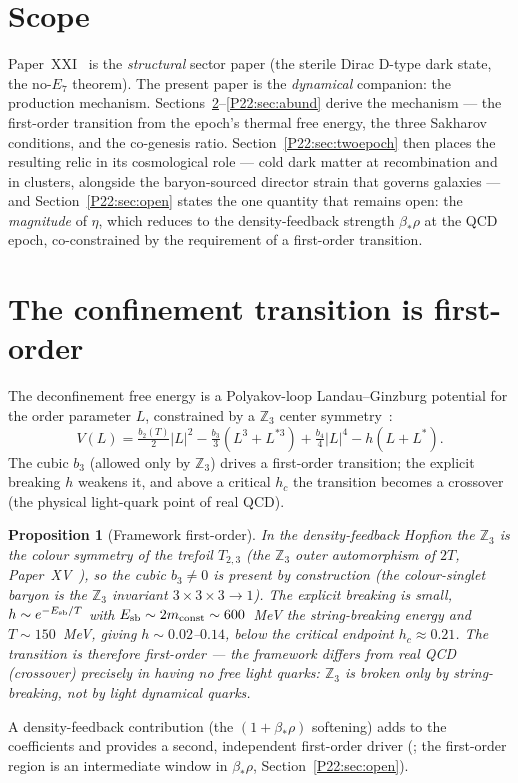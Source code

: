\documentclass[11pt,a4paper]{article}
\newtheorem{proposition}[theorem]{Proposition}
\theoremstyle{definition}\newtheorem{definition}[theorem]{Definition}
\newcommand{\twoT}{2T}
\newcommand{\Zthree}{\mathbb{Z}_3}
\begin{document}
\tableofcontents

\section{Scope}
Paper~XXI~\cite{Paper21} is the \emph{structural} sector paper (the sterile Dirac D-type
dark state, the no-$E_7$ theorem). The present paper is the \emph{dynamical} companion: the
production mechanism. Sections~\ref{P22:sec:fo}--\ref{P22:sec:abund} derive the mechanism --- the
first-order transition from the epoch's thermal free energy, the three Sakharov conditions, and
the co-genesis ratio. Section~\ref{P22:sec:twoepoch} then places the resulting relic in its
cosmological role --- cold dark matter at recombination and in clusters, alongside the
baryon-sourced director strain that governs galaxies --- and Section~\ref{P22:sec:open} states
the one quantity that remains open: the \emph{magnitude} of $\eta$, which reduces to the
density-feedback strength $\beta_*\rho$ at the QCD epoch, co-constrained by the requirement of a
first-order transition.

\section{The confinement transition is first-order}
\label{P22:sec:fo}
The deconfinement free energy is a Polyakov-loop Landau--Ginzburg potential for the order
parameter $L$, constrained by a $\Zthree$ center symmetry~\cite{Pisarski2000}:
\begin{equation}
  V(L)=\tfrac{b_2(T)}{2}|L|^2-\tfrac{b_3}{3}(L^3+L^{*3})+\tfrac{b_4}{4}|L|^4-h(L+L^*).
  \label{P22:eq:polyakov}
\end{equation}
The cubic $b_3$ (allowed only by $\Zthree$) drives a first-order transition; the explicit
breaking $h$ weakens it, and above a critical $h_c$ the transition becomes a crossover
(the physical light-quark point of real QCD).

\begin{proposition}[Framework first-order]
\label{P22:prop:fo}
In the density-feedback Hopfion the $\Zthree$ is the colour symmetry of the trefoil
$T_{2,3}$ (the $\Zthree$ outer automorphism of $\twoT$, Paper~XV~\cite{Paper15}), so the
cubic $b_3\neq0$ is present by construction (the colour-singlet baryon is the $\Zthree$
invariant $3\times3\times3\to1$). The explicit breaking is small, $h\sim e^{-E_{\rm sb}/T}$
with $E_{\rm sb}\sim2m_{\rm const}\sim600$~MeV the string-breaking energy and
$T\sim150$~MeV, giving $h\sim0.02$--$0.14$, below the critical endpoint $h_c\approx0.21$.
The transition is therefore first-order --- the framework differs from real QCD (crossover)
precisely in having no free light quarks: $\Zthree$ is broken only by string-breaking, not by
light dynamical quarks.
\end{proposition}
\noindent A density-feedback contribution (the $(1+\beta_*\rho)$ softening) adds to the
coefficients and provides a second, independent first-order driver (;
the first-order region is an intermediate window in $\beta_*\rho$, Section~\ref{P22:sec:open}).
\end{document}
